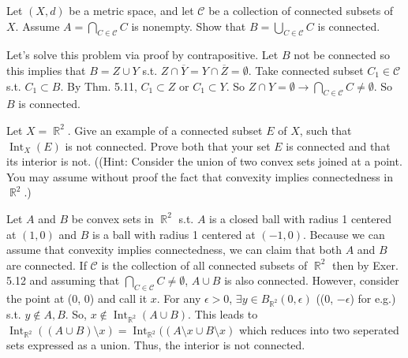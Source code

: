 \documentclass[12pt,letterpaper,boxed]{hmcpset}
\DeclareMathOperator{\Int}{Int}
\DeclareMathOperator{\R}{\mathbb{R}}
\begin{document}
\begin{problem}[Exercise 5.12]
Let $(X,d)$ be a metric space, and let $\mathcal{C}$ be a collection of connected subsets of $X$. Assume $A = \bigcap_{C \in \mathcal{C}} C$ is nonempty. Show that $B = \bigcup_{C \in \mathcal{C}} C$ is connected.
\end{problem}

\begin{solution}
 Let's solve this problem via proof by contrapositive. Let $B$ not be connected so this implies that $B=Z\cup Y$ s.t. $Z \cap \overline{Y}=Y \cap \overline{Z} = \emptyset.$ Take connected subset $C_1 \in \mathcal{C}$ s.t. $C_1 \subset B$. By Thm. 5.11, $C_1 \subset Z$ or $C_1 \subset Y.$ So $Z \cap Y = \emptyset \rightarrow \bigcap_{C \in \mathcal{C}} C \neq \emptyset.$ So $B$ is connected.
\end{solution}

\begin{problem}[Exercise 5.13]
Let $X = \R^{2}$. Give an example of a connected subset $E$ of $X$, such that $\Int_X(E)$ is not connected. Prove both that your set $E$ is connected and that its interior is not. ((Hint: Consider the
union of two convex sets joined at a point. You may assume without proof the fact that convexity implies
connectedness in $\R^{2}$.)
\end{problem}

\begin{solution}
Let $A$ and $B$ be convex sets in $\R^{2}$ s.t. $A$ is a closed ball with radius 1 centered at $(1, 0)$ and $B$ is a ball with radius 1 centered at $(-1, 0)$. Because we can assume that convexity implies connectedness, we can claim that both $A$ and $B$ are connected. If $\mathcal{C}$ is the collection of all connected subsets of $\R^{2}$ then by Exer. 5.12 and assuming that $\bigcap_{C \in \mathcal{C}} C \neq \emptyset$, $A \cup B$ is also connected. However, consider the point at (0, 0) and call it $x$. For any $\epsilon > 0$, $\exists y \in B_{\R^{2}}(0 , \epsilon)$ ((0, $-\epsilon$) for e.g.) s.t. $y \notin A, B.$ So, $x \notin \Int_{\R^{2}}(A \cup B)$. This leads to $\Int_{\R^{2}}((A \cup B)\setminus x)= \Int_{\R^{2}}((A\setminus x \cup B\setminus x)$ which reduces into two seperated sets expressed as a union. Thus, the interior is not connected.
\end{solution}
\end{document}
